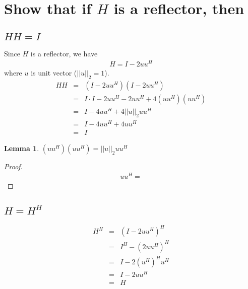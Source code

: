 \documentclass[11pt,a4paper]{article}
\newtheorem{lemma}{Lemma}
\begin{document}
\begin{titlepage}
    \maketitle
\end{titlepage}
%
\newcommand{\be}{\begin{eqnarray}}
\newcommand{\ee}{\end{eqnarray}}
\newcommand{\no}{\nonumber}
\newpage
\setcounter{section}{1}
\section{Show that if $H$ is a reflector, then}
\subsection{$HH=I$}
Since $H$ is a reflector, we have
\be
    H = I - 2 u u ^H 
\ee
where $u$ is unit vector ($||u||_2 = 1$).
\be
    H H &=& (I - 2 u u ^H) (I - 2 u u ^H) \no \\
    &=& I \cdot I - 2 u u^H - 2 u u^H + 4(uu^H) (uu^H) \no \\
    &=& I - 4 u u ^H + 4 ||u||_2 u u ^H \no \\
    &=& I - 4 u u ^H + 4  u u ^H \no \\
    &=& I \label{2.1conclusion} 
\ee
\begin{lemma}
    $ (uu^H) (uu^H) = ||u||_2 u u^H$
\end{lemma}
\begin{proof}
\be
    uu^H = 
\ee
\end{proof}
\subsection{$H=H^H$}
\be
    H^H &=& (I - 2uu^H) ^H \no \\
    &=& I^H - (2uu^H)^H \no\\
    &=& I - 2(u^H)^H u^H  \no\\
    &=& I - 2 u u^H \no\\
    &=& H \label{2.2conclusion} 
\ee
\end{document}
